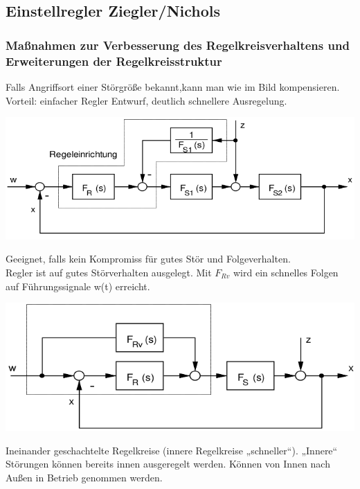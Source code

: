 \documentclass[10pt,a4paper]{article}
\begin{document}
\subsection{Einstellregler Ziegler/Nichols}
\subsubsection{Maßnahmen zur Verbesserung des Regelkreisverhaltens und Erweiterungen der Regelkreisstruktur}

\begin{mdframed}[style=exercise, frametitle=Störgrößenaufschaltung:]
	Falls Angriffsort einer Störgröße bekannt,kann man wie im Bild kompensieren.\\
	Vorteil: einfacher Regler Entwurf, deutlich schnellere Ausregelung.
\end{mdframed}

\includegraphics[width=0.9\columnwidth]{Figures/Stoergoesenschaltung.png}


\begin{mdframed}[style=exercise, frametitle=Vorsteuerung:]
	Geeignet, falls kein Kompromiss für gutes Stör und Folgeverhalten.\\
	Regler ist auf gutes Störverhalten ausgelegt. Mit $F_{Rv}$ wird ein schnelles Folgen
	auf Führungssignale w(t) erreicht.
\end{mdframed}

\includegraphics[width=0.9\columnwidth]{Figures/Vorsteuerung.png}


\begin{mdframed}[style=exercise, frametitle=Kaskadenregelung:]
	Ineinander geschachtelte Regelkreise (innere Regelkreise „schneller“). „Innere“
	Störungen können bereits innen ausgeregelt werden. Können von Innen nach Außen in Betrieb genommen werden.
\end{mdframed}
\end{document}
